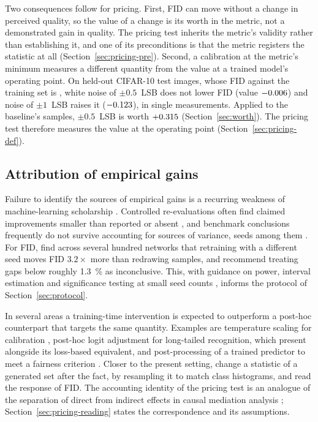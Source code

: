 Two consequences follow for pricing. First, FID can move without a change in
perceived quality, so the value of a change is its worth in the metric, not a
demonstrated gain in quality. The pricing test inherits the metric's validity
rather than establishing it, and one of its preconditions is that the metric
registers the statistic at all (Section~\ref{sec:pricing-pre}). Second, a
calibration at the metric's minimum measures a different quantity from the
value at a trained model's operating point. On held-out CIFAR-10 test images,
whose FID against the training set is \realTestFID{}, white noise of $\pm0.5$~LSB
does not lower FID (value $-0.006$) and noise of $\pm1$~LSB
raises it ($-0.123$), in single measurements. Applied to the baseline's
samples, $\pm0.5$~LSB is worth $+0.315$
(Section~\ref{sec:worth}). The pricing test therefore measures the value at
the operating point (Section~\ref{sec:pricing-def}).

\subsection{Attribution of empirical gains}
\label{sec:related-attribution}

Failure to identify the sources of empirical gains is a recurring weakness of
machine-learning scholarship \citep{lipton2019troubling}. Controlled
re-evaluations often find claimed improvements smaller than reported or absent
\citep{melis2018state,lucic2018gans,musgrave2020metric}, and benchmark
conclusions frequently do not survive accounting for sources of variance,
seeds among them \citep{bouthillier2021accounting}. For FID,
\citet{dufour2026fid} find across several hundred networks that retraining
with a different seed moves FID $3.2\times$ more than redrawing samples, and
recommend treating gaps below roughly \SI{1.3}{\percent} as inconclusive.
This, with guidance on power, interval estimation and significance testing at
small seed counts \citep{colas2018many,agarwal2021deep,dror2018hitchhiker},
informs the protocol of Section~\ref{sec:protocol}.

In several areas a training-time intervention is expected to outperform a
post-hoc counterpart that targets the same quantity. Examples are temperature
scaling for calibration \citep{guo2017calibration}, post-hoc logit adjustment
for long-tailed recognition, which \citet{menon2021long} present alongside its
loss-based equivalent, and post-processing of a trained predictor to meet a
fairness criterion \citep{hardt2016equality}. Closer to the present setting,
\citet{kynkaanniemi2023role} change a statistic of a generated set after the
fact, by resampling it to match class histograms, and read the response of
FID. The accounting identity of the pricing test is an analogue of the
separation of direct from indirect effects in causal mediation analysis
\citep{robins1992identifiability,pearl2001direct};
Section~\ref{sec:pricing-reading} states the correspondence and its
assumptions.

